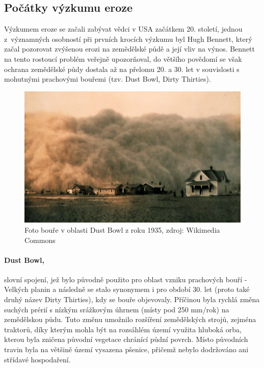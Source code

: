 \subsection{Počátky výzkumu eroze}
Výzkumem eroze se začali zabývat vědci v USA začátkem 20. století,
jednou z~významných osobností při prvních krocích výzkumu byl Hugh
Bennett, který začal pozorovat zvýšenou erozi na zemědělské půdě a
její vliv na výnos. Bennett na tento rostoucí problém veřejně
upozorňoval, do většího povědomí se však ochrana zemědělské půdy
dostala až na přelomu 20. a 30. let v souvislosti s mohutnými
prachovými bouřemi (tzv. Dust Bowl, Dirty Thirties).\cite{usda_ars}
\begin{figure}[H]
    \centering \includegraphics[scale=0.7]{./pictures/Dust_bowl.png}
      \caption[Foto bouře v oblasti Dust Bowl z roku 1935]{Foto bouře
        v oblasti Dust Bowl z roku 1935, zdroj: Wikimedia
        Commons\cite{wikicommons}}
      \label{fig:dust_bowl}
\end{figure}

\paragraph{Dust Bowl,} slovní spojení, jež bylo původně použito pro oblast vzniku prachových
bouří - Velkých planin a následně se stalo synonymem i pro období
30. let (proto také druhý název Dirty Thirties), kdy se bouře
objevovaly. Příčinou byla rychlá změna suchých prérií s nízkým
srážkovým úhrnem (místy pod 250 mm/rok) na zemědělskou půdu. Tuto
změnu umožnilo rozšíření zemědělských strojů, zejména traktorů, díky
kterým mohla být na rozsáhlém území využita hluboká orba, kterou byla
zničena původní vegetace chránící půdní povrch. Místo původních travin
byla na většině území vysazena pšenice, přičemž nebylo dodržováno ani
střídavé hospodaření.

